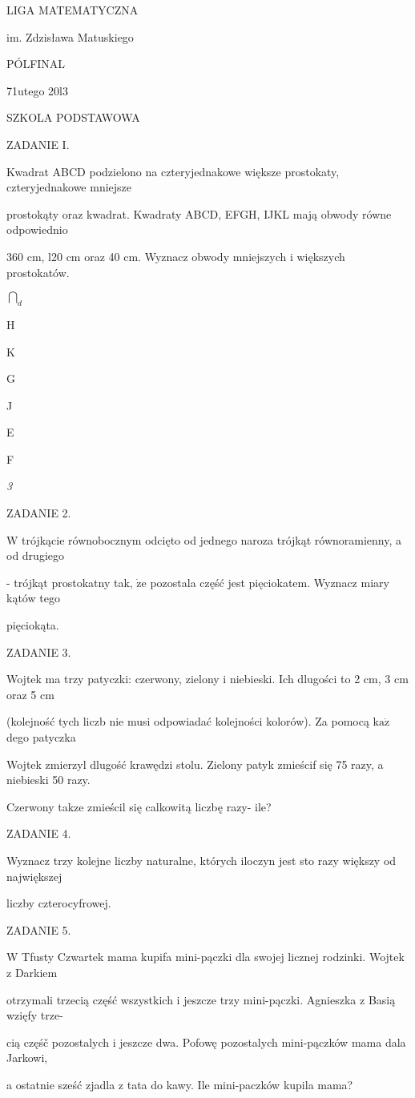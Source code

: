 \documentclass[a4paper,12pt]{article}
\begin{document}
LIGA MATEMATYCZNA

im. Zdzisława Matuskiego

PÓLFINAL

71utego 20l3

SZKOLA PODSTAWOWA

ZADANIE I.

Kwadrat ABCD podzielono na czteryjednakowe większe prostokaty, czteryjednakowe mniejsze

prostokąty oraz kwadrat. Kwadraty ABCD, EFGH, IJKL mają obwody równe odpowiednio

360 cm, l20 cm oraz 40 cm. Wyznacz obwody mniejszych i większych prostokatów.

$\displaystyle \bigcap_{d}$

H

K

G

J

E

F

{\it 3}

ZADANIE 2.

$\mathrm{W}$ trójkącie równobocznym odcięto od jednego naroza trójkąt równoramienny, a od drugiego

- trójkąt prostokatny tak, $\dot{\mathrm{z}}\mathrm{e}$ pozostala część jest pięciokatem. Wyznacz miary kątów tego

pięciokąta.

ZADANIE 3.

Wojtek ma trzy patyczki: czerwony, zielony i niebieski. Ich dlugości to 2 cm, 3 cm oraz 5 cm

(kolejność tych liczb nie musi odpowiadać kolejności kolorów). Za pomocą $\mathrm{k}\mathrm{a}\dot{\mathrm{z}}$ dego patyczka

Wojtek zmierzyl dlugość krawędzi stolu. Zielony patyk zmieścif się 75 razy, a niebieski 50 razy.

Czerwony takze zmieścil się calkowitą liczbę razy- ile?

ZADANIE 4.

Wyznacz trzy kolejne liczby naturalne, których iloczyn jest sto razy większy od największej

liczby czterocyfrowej.

ZADANIE 5.

W Tfusty Czwartek mama kupifa mini-pączki dla swojej licznej rodzinki. Wojtek z Darkiem

otrzymali trzecią część wszystkich i jeszcze trzy mini-pączki. Agnieszka z Basią wzięfy trze-

cią częśč pozostalych i jeszcze dwa. Pofowę pozostalych mini-pączków mama dala Jarkowi,

a ostatnie sześć zjadla z tata do kawy. Ile mini-paczków kupila mama?
\end{document}
